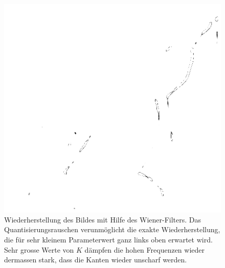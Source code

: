 \begin{figure}
\quad
\includegraphics[width=0.31\hsize]{8-filter/images/lena-deblurred-l012.png}
\caption{Wiederherstellung des Bildes mit Hilfe des Wiener-Filters.
Das Quantisierungsrauschen verunmöglicht die exakte Wiederherstellung,
die für sehr kleinem Parameterwert ganz links oben erwartet wird.
Sehr grosse Werte von $K$ dämpfen die hohen Frequenzen wieder dermassen
stark, dass die Kanten wieder unscharf werden.
\label{filter:wiener:figure:wiederherstellung}}
\end{figure}





